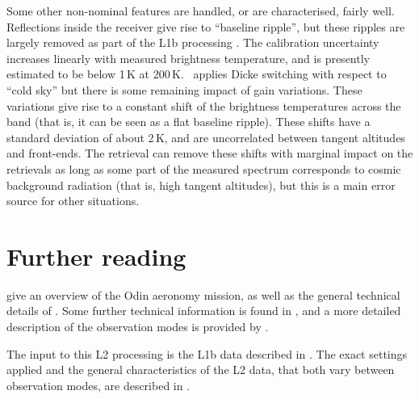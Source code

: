 Some other non-nominal features are handled, or are characterised, fairly well.
Reflections inside the receiver give rise to ``baseline ripple'', but these
ripples are largely removed as part of the L1b processing \citep{atbdl1b}. The
calibration uncertainty increases linearly with measured brightness
temperature, and is presently estimated to be below 1\,K at 200\,K. \smr\
applies Dicke switching with respect to ``cold sky'' but there is some
remaining impact of gain variations. These variations give rise to a constant
shift of the brightness temperatures across the band (that is, it can be seen
as a flat baseline ripple). These shifts have a standard deviation of about
2\,K, and are uncorrelated between tangent altitudes and front-ends. The
retrieval can remove these shifts with marginal impact on the retrievals as
long as some part of the measured spectrum corresponds to cosmic background
radiation (that is, high tangent altitudes), but this is a main error source
for other situations.



\section{Further reading}
\label{sec:reading}
%
\citet{murtagh:anove:02} give an overview of the Odin aeronomy mission, as well
as the general technical details of \smr. Some further technical information
is found in \citet{eriksson:studi:02}, and a more detailed description of
the observation modes is provided by \citet{merino:studi:02}.

The input to this L2 processing is the L1b data described in \citet{atbdl1b}. The
exact settings applied and the general characteristics of the L2 data, that
both vary between observation modes, are described in \citet{atbdl2data}.




